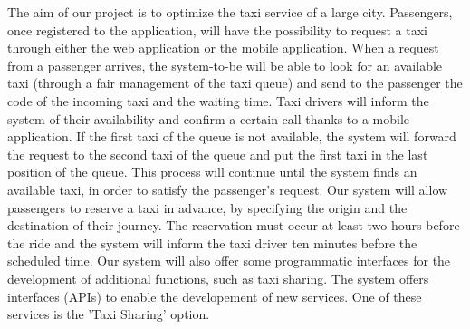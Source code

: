 The aim of our project is to optimize the taxi service of a large city. 
Passengers, once registered to the application, will have the possibility to request a taxi through either the web application or the mobile application. When a request from a passenger arrives, the system-to-be will be able to look for an available taxi (through a fair management of the taxi queue) and send to the passenger the code of the incoming taxi and the waiting time. Taxi drivers will inform the system of their availability and confirm a certain call thanks to a mobile application.
\newline
If the first taxi of the queue is not available, the system will forward the request to the second taxi of the queue and put the first taxi in the last position of the queue. This process will continue until the system finds an available taxi, in order to satisfy the passenger's request.
\newline
Our system will allow passengers to reserve a taxi in advance, by specifying the origin and the destination of their journey. The reservation must occur at least two hours before the ride and the system will inform the taxi driver ten minutes before the scheduled time.
\newline
Our system will also offer some programmatic interfaces for the development of additional functions, such as taxi sharing.
\newline
The system offers interfaces (APIs) to enable the developement of new services.
One of these services is the 'Taxi Sharing' option.